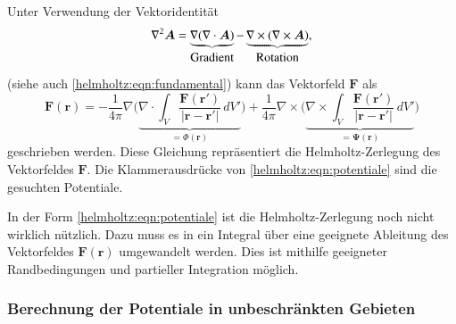 
Unter Verwendung der Vektoridentität
\begin{equation*}
\nabla^2 \boldsymbol{A}
=
\underbrace{
\nabla ( \nabla \cdot \boldsymbol{A} )
}_{
\textstyle\text{Gradient\strut}
}
-
\underbrace{
\nabla \times (\nabla \times \boldsymbol{A} )
}_{
\textstyle\text{Rotation\strut}
},
\end{equation*}
(siehe auch \eqref{helmholtz:eqn:fundamental})
kann das Vektorfeld $\boldsymbol{F}$ als
\begin{equation}
\boldsymbol{F}(\boldsymbol{r})
=
- \frac{1}{4 \pi} \nabla \biggl(
\underbrace{
\nabla \cdot \int_V
\frac{\boldsymbol{F}(\boldsymbol{r}')
}{
|\boldsymbol{r}
-
\boldsymbol{r}'|} \,dV'
}_{\displaystyle = \Phi(\boldsymbol{r})}
\biggr)
+
\frac{1}{4 \pi} \nabla \times \biggl(
\underbrace{
\nabla \times
\int_V
\frac{\boldsymbol{F}(\boldsymbol{r}')
}{
|\boldsymbol{r} - \boldsymbol{r}'|
}
\,dV'
}_{\displaystyle = \boldsymbol{\Psi}(\boldsymbol{r})}
\biggr)
\label{helmholtz:eqn:potentiale}
\end{equation}
geschrieben werden.
Diese Gleichung repräsentiert die Helmholtz-Zerlegung des Vektorfeldes
$\boldsymbol{F}$.
Die Klammerausdrücke von \eqref{helmholtz:eqn:potentiale}
sind die gesuchten Potentiale.

In der Form \eqref{helmholtz:eqn:potentiale} ist die Helmholtz-Zerlegung
noch nicht wirklich nützlich.
Dazu muss es in ein Integral über eine geeignete Ableitung des
Vektorfeldes $\boldsymbol{F}(\boldsymbol{r})$ umgewandelt werden.
Dies ist mithilfe geeigneter Randbedingungen und partieller Integration
möglich.

\subsubsection{Berechnung der Potentiale in unbeschränkten Gebieten}

